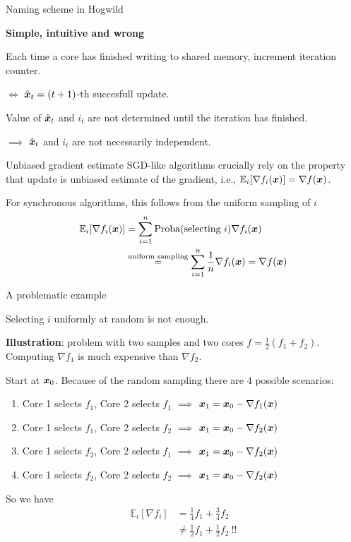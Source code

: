 \documentclass[10pt]{beamer}
\begin{document}
\begin{frame}{Naming scheme in Hogwild}

{\bfseries Simple, intuitive and wrong}

Each time a core has finished writing to shared memory, increment iteration counter.

$\iff$ $\hat{{\boldsymbol x}}_t = (t+1)$-th succesfull update.

Value of $\hat{{\boldsymbol x}}_t$ and $i_t$ are not determined until the iteration has finished.

$\implies$ $\hat{{\boldsymbol x}}_t$ and $i_t$  are not necessarily independent.

\end{frame}

\begin{frame}{Unbiased gradient estimate}
SGD-like algorithms crucially rely on the property that update is unbiased estimate of the gradient, i.e., $\mathbb{E}_i[\nabla f_i({\boldsymbol x})] = \nabla f({\boldsymbol x})$.

For synchronous algorithms, this follows from the uniform sampling of $i$ 
\begin{align*}
\mathbb{E}_i[\nabla f_i({\boldsymbol x})] &= \sum_{i=1}^n \text{Proba}(\text{selecting}~i) \nabla f_i({\boldsymbol x})\\
 &\stackrel{\text{uniform sampling}}{=} \sum_{i=1}^n \frac{1}{n} \nabla f_i({\boldsymbol x}) = \nabla f({\boldsymbol x})
\end{align*}
\end{frame}

\begin{frame}{A problematic example}

Selecting $i$ uniformly at random is not enough. 

\pause
{\bfseries Illustration}: problem with two samples and two cores $f = \frac{1}{2}(f_1 + f_2)$. Computing $\nabla f_1$ is much expensive than $\nabla f_2$.

Start at ${\boldsymbol x}_0$. Because of the random sampling there are 4 possible scenarios:
\begin{enumerate}
\item Core 1 selects $f_1$, Core 2 selects $f_1$ $\implies$ ${\boldsymbol x}_1 = {\boldsymbol x}_0 - \nabla f_1({\boldsymbol x})$
\item Core 1 selects $f_1$, Core 2 selects $f_2$ $\implies$ ${\boldsymbol x}_1 = {\boldsymbol x}_0 - \nabla f_2({\boldsymbol x})$
\item Core 1 selects $f_2$, Core 2 selects $f_1$ $\implies$ ${\boldsymbol x}_1 = {\boldsymbol x}_0 - \nabla f_2({\boldsymbol x})$
\item Core 1 selects $f_2$, Core 2 selects $f_2$ $\implies$ ${\boldsymbol x}_1 = {\boldsymbol x}_0 - \nabla f_2({\boldsymbol x})$
\end{enumerate}
So we have
\begin{align*}
\mathbb{E}_i\left[\nabla f_i\right] &= \frac{1}{4}f_1 + \frac{3}{4} f_2 \\
&\neq \frac{1}{2}f_1 + \frac{1}{2} f_2 ~!!
\end{align*}
\end{frame}
\end{document}
